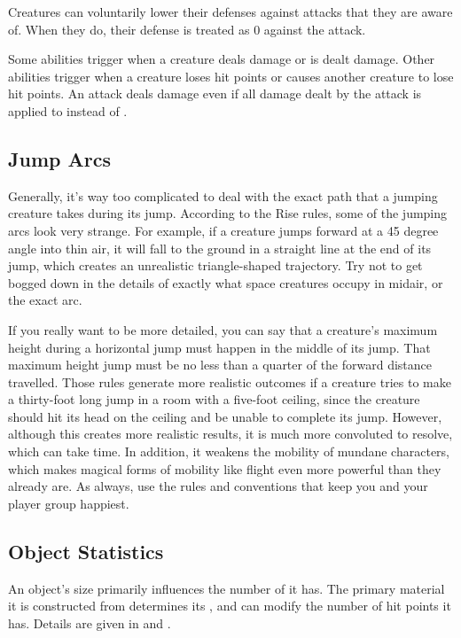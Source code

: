   Creatures can voluntarily lower their defenses against attacks that they are aware of.
  When they do, their defense is treated as 0 against the attack.

  Some abilities trigger when a creature deals damage or is dealt damage.
  Other abilities trigger when a creature loses hit points or causes another creature to lose hit points.
  An attack deals damage even if all damage dealt by the attack is applied to  instead of .

  \subsection{Jump Arcs}
    Generally, it's way too complicated to deal with the exact path that a jumping creature takes during its jump.
    According to the Rise rules, some of the jumping arcs look very strange.
    For example, if a creature jumps forward at a 45 degree angle into thin air, it will fall to the ground in a straight line at the end of its jump, which creates an unrealistic triangle-shaped trajectory.
    Try not to get bogged down in the details of exactly what space creatures occupy in midair, or the exact arc.

    If you really want to be more detailed, you can say that a creature's maximum height during a horizontal jump must happen in the middle of its jump.
    That maximum height jump must be no less than a quarter of the forward distance travelled.
    Those rules generate more realistic outcomes if a creature tries to make a thirty-foot long jump in a room with a five-foot ceiling, since the creature should hit its head on the ceiling and be unable to complete its jump.
    However, although this creates more realistic results, it is much more convoluted to resolve, which can take time.
    In addition, it weakens the mobility of mundane characters, which makes magical forms of mobility like flight even more powerful than they already are.
    As always, use the rules and conventions that keep you and your player group happiest.

  \subsection{Object Statistics}
    An object's size primarily influences the number of  it has.
    The primary material it is constructed from determines its , and can modify the number of hit points it has.
    Details are given in  and .

